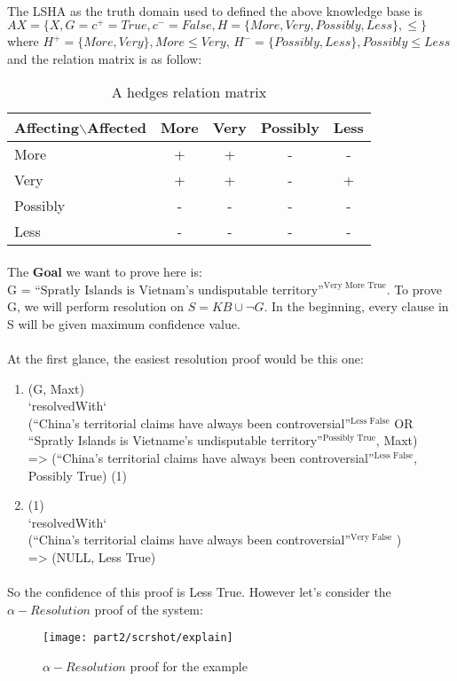 \documentclass[../gr-final.tex]{subfiles}
\begin{document}
\paragraph{} The LSHA as the truth domain used to defined the
above knowledge base is $AX = \{X, G = {c^{+} = True, c^{-} =
False}, H = \{More, Very, Possibly, Less\}, \le\}$ \\ where $H^{+} =
\{More, Very\}, More \le Very$, $H^{-} = \{Possibly, Less\},
Possibly \le Less$ and the relation matrix is as follow:
\begin{table}[H]
  \centering
\begin{tabular}{|l|c|c|c|c|}
\hline
            Affecting$\backslash$Affected & More & Very & Possibly & Less \\ \hline
            More                        & +    & +    & -    & -    \\ \hline
            Very                        & +    & +    & -    & +    \\ \hline
            Possibly                    & -    & -    & -    & -    \\ \hline
            Less                        & -    & -    & -    & -    \\ \hline
\end{tabular}
\caption {A hedges relation matrix}
\end{table}
\paragraph{} The {\bfseries Goal} we want to prove here is:\\ G = 
\(\text{``Spratly Islands is Vietnam's undisputable
territory''}^{\text{Very More True}}\). To prove G, we will
perform resolution on $S = KB \cup \neg{G}$. In the beginning, every
clause in S will be given maximum confidence value.
\paragraph{} At the first glance, the easiest resolution proof
would be this one:
\begin{enumerate}
  \item (G, Maxt)\\
    `resolvedWith`\\
    (``China's territorial claims have always been
    controversial''$^{\text{Less False}}$ OR ``Spratly Islands is Vietname's
    undisputable territory''$^{\text{Possibly True}}$, Maxt)\\
    \indent  => (``China's territorial claims have always been
    controversial''$^{\text{Less False}}$, Possibly True) (1)
  \item (1)\\
    `resolvedWith`\\
    (``China's territorial claims have always been
    controversial''$^{\text{Very False}}$ )\\
    \indent => (NULL, Less True)
\end{enumerate}
\paragraph{} So the confidence of this proof is Less True. However let's
consider the $\alpha-Resolution$ proof of the system:
\begin{figure}[H]
  \centering
  \texttt{[image: part2/scrshot/explain]}
  \caption{$\alpha-Resolution$ proof for the example}
\end{figure}
\end{document}
